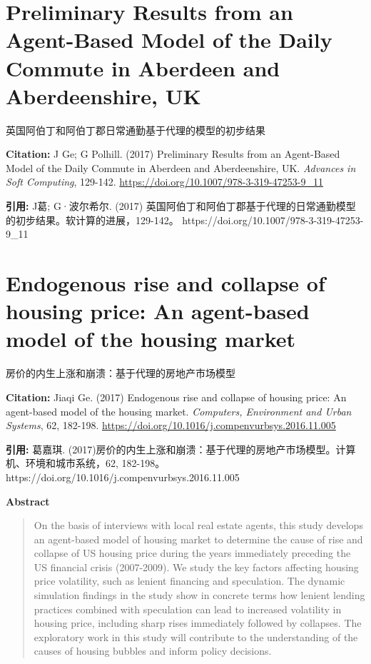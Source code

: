 \chapter{Preliminary Results from an Agent-Based Model of the Daily Commute in Aberdeen and Aberdeenshire, UK}
\begin{center}\small 英国阿伯丁和阿伯丁郡日常通勤基于代理的模型的初步结果\end{center}

\noindent\textbf{Citation:} J Ge; G Polhill. (2017) Preliminary Results from an Agent-Based Model of the Daily Commute in Aberdeen and Aberdeenshire, UK. \textit{Advances in Soft Computing}, 129-142. \url{https://doi.org/10.1007/978-3-319-47253-9_11}

\vspace{0.5em}
\noindent\textbf{引用:} J葛; G·波尔希尔. (2017) 英国阿伯丁和阿伯丁郡基于代理的日常通勤模型的初步结果。软计算的进展，129-142。 https://doi.org/10.1007/978-3-319-47253-9\_11

\vspace{0.5em}
\chapter{Endogenous rise and collapse of housing price: An agent-based model of the housing market}
\begin{center}\small 房价的内生上涨和崩溃：基于代理的房地产市场模型\end{center}

\noindent\textbf{Citation:} Jiaqi Ge. (2017) Endogenous rise and collapse of housing price: An agent-based model of the housing market. \textit{Computers, Environment and Urban Systems}, 62, 182-198. \url{https://doi.org/10.1016/j.compenvurbsys.2016.11.005}

\vspace{0.5em}
\noindent\textbf{引用:} 葛嘉琪. (2017)房价的内生上涨和崩溃：基于代理的房地产市场模型。计算机、环境和城市系统，62, 182-198。 https://doi.org/10.1016/j.compenvurbsys.2016.11.005

\vspace{1.5em}
\noindent\textbf{Abstract}\par
\begin{quote}\small
On the basis of interviews with local real estate agents, this study develops an agent-based model of housing market to determine the cause of rise and collapse of US housing price during the years immediately preceding the US financial crisis (2007-2009). We study the key factors affecting housing price volatility, such as lenient financing and speculation. The dynamic simulation findings in the study show in concrete terms how lenient lending practices combined with speculation can lead to increased volatility in housing price, including sharp rises immediately followed by collapses. The exploratory work in this study will contribute to the understanding of the causes of housing bubbles and inform policy decisions.
\end{quote}

